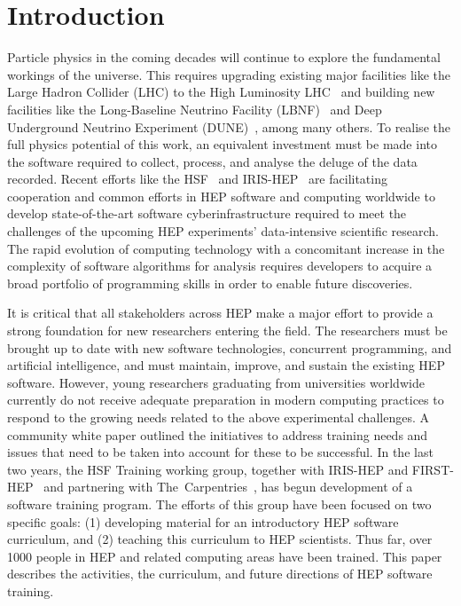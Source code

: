 \documentclass[twocolumn]{svjour3}          %
\begin{document}
\section{Introduction}
\label{intro}
Particle physics in the coming decades will continue to explore the fundamental workings of the universe. This requires  upgrading existing major facilities like the Large Hadron Collider (LHC) to the High Luminosity LHC~\cite{hl-lhc} and building new facilities like the Long-Baseline Neutrino Facility (LBNF)~\cite{papadimitriou2017design} and Deep Underground Neutrino Experiment (DUNE)~\cite{dune}, among many others.  To realise the full physics potential of this work, an equivalent investment must be made into the software required to collect, process, and analyse the deluge of the data recorded. Recent efforts like the HSF~\cite{HSF-homepage} and IRIS-HEP~\cite{iris-hep} are facilitating cooperation and common efforts in HEP software and computing worldwide to develop state-of-the-art software cyberinfrastructure required to meet the challenges of the upcoming HEP experiments'  data-intensive scientific research. The rapid evolution of computing technology with a  concomitant increase in the complexity of software algorithms for analysis requires developers to acquire a broad portfolio of programming skills in order to enable future discoveries.

It is critical that all stakeholders across HEP make a major effort to provide a strong foundation for new researchers entering the field. The researchers must be brought up to date with new software technologies, concurrent programming, and artificial intelligence, and must maintain, improve, and sustain the existing HEP software. However, young researchers graduating from universities worldwide currently do not receive adequate preparation in modern computing practices to respond to the growing needs related to the above experimental challenges. A community white paper \cite{hsfwptraining} outlined the initiatives to address training needs and issues that need to be taken into account for these to be successful. In the last two years, the HSF Training working group, together with IRIS-HEP and FIRST-HEP~\cite{first-hep} and partnering with The~Carpentries~\cite{carpentries}, has begun development of a software training program. The efforts of this group have been focused on two specific goals: (1) developing material for an introductory HEP software curriculum, and (2) teaching this curriculum to HEP scientists. Thus far, over 1000 people in HEP and related computing areas have been trained. This paper describes the activities, the curriculum, and future directions of HEP software training.
%
\end{document}

